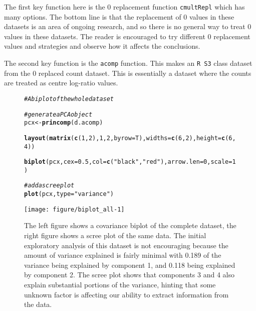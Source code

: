 \documentclass[11pt]{article}\usepackage[]{graphicx}\usepackage[]{color}
\makeatletter
\def\maxwidth{ %
  \ifdim\Gin@nat@width>\linewidth
    \linewidth
  \else
    \Gin@nat@width
  \fi
}
\newcommand{\hlnum}[1]{\textcolor[rgb]{0.686,0.059,0.569}{#1}}%
\newcommand{\hlstr}[1]{\textcolor[rgb]{0.192,0.494,0.8}{#1}}%
\newcommand{\hlcom}[1]{\textcolor[rgb]{0.678,0.584,0.686}{\textit{#1}}}%
\newcommand{\hlstd}[1]{\textcolor[rgb]{0.345,0.345,0.345}{#1}}%
\newcommand{\hlkwb}[1]{\textcolor[rgb]{0.69,0.353,0.396}{#1}}%
\newcommand{\hlkwc}[1]{\textcolor[rgb]{0.333,0.667,0.333}{#1}}%
\newcommand{\hlkwd}[1]{\textcolor[rgb]{0.737,0.353,0.396}{\textbf{#1}}}%
\newenvironment{kframe}{%
 \def\at@end@of@kframe{}%
 \ifinner\ifhmode%
  \def\at@end@of@kframe{\end{minipage}}%
  \begin{minipage}{\columnwidth}%
 \fi\fi%
 \def\FrameCommand##1{\hskip\@totalleftmargin \hskip-\fboxsep
 \colorbox{shadecolor}{##1}\hskip-\fboxsep
     \hskip-\linewidth \hskip-\@totalleftmargin \hskip\columnwidth}%
 \MakeFramed {\advance\hsize-\width
   \@totalleftmargin\z@ \linewidth\hsize
   \@setminipage}}%
 {\par\unskip\endMakeFramed%
 \at@end@of@kframe}
\newenvironment{knitrout}{}{} %
\makeatother
\begin{document}
The first key function here is the 0 replacement function  {\tt cmultRepl} which has many options. The bottom line is that the replacement of 0 values in these datasets is an area of ongoing research, and so there is no general way to treat 0 values in these datasets. The reader is encouraged to try different 0 replacement values and strategies and observe how it affects the conclusions. 

The second key function is the {\tt acomp} function. This makes an {\tt R S3} class dataset from the 0 replaced count dataset. This is essentially a dataset where the counts are treated as centre log-ratio values. 

\begin{figure}
\begin{center}

\begin{knitrout}
\color{fgcolor}\begin{kframe}
\begin{alltt}
\hlcom{# A biplot of the whole dataset}

\hlcom{# generate a PCA object}
\hlstd{pcx} \hlkwb{<-} \hlkwd{princomp}\hlstd{(d.acomp)}

\hlkwd{layout}\hlstd{(}\hlkwd{matrix}\hlstd{(}\hlkwd{c}\hlstd{(}\hlnum{1}\hlstd{,}\hlnum{2}\hlstd{),}\hlnum{1}\hlstd{,}\hlnum{2}\hlstd{,} \hlkwc{byrow}\hlstd{=T),} \hlkwc{widths}\hlstd{=}\hlkwd{c}\hlstd{(}\hlnum{6}\hlstd{,}\hlnum{2}\hlstd{),} \hlkwc{height}\hlstd{=}\hlkwd{c}\hlstd{(}\hlnum{6}\hlstd{,}\hlnum{4}\hlstd{))}

\hlkwd{biplot}\hlstd{(pcx,} \hlkwc{cex}\hlstd{=}\hlnum{0.5}\hlstd{,} \hlkwc{col}\hlstd{=}\hlkwd{c}\hlstd{(}\hlstr{"black"}\hlstd{,} \hlstr{"red"}\hlstd{),} \hlkwc{arrow.len}\hlstd{=}\hlnum{0}\hlstd{,} \hlkwc{scale}\hlstd{=}\hlnum{1}\hlstd{)}

\hlcom{# add a scree plot}
\hlkwd{plot}\hlstd{(pcx,} \hlkwc{type}\hlstd{=}\hlstr{"variance"}\hlstd{)}
\end{alltt}
\end{kframe}
\texttt{[image: figure/biplot\_all-1]} 

\end{knitrout}
\caption{The left figure shows a covariance biplot of the complete dataset, the right figure shows a scree plot of the same data. The initial exploratory analysis of this dataset is not encouraging because  the amount of variance explained is fairly minimal with 0.189 of the variance being explained by component 1, and 0.118 being explained by component 2. The scree plot shows that components 3 and 4 also explain substantial portions of the variance, hinting that some unknown factor is affecting our ability to extract information from the data. }
\label{biplot_all}
\end{center}
\end{figure}
\end{document}
